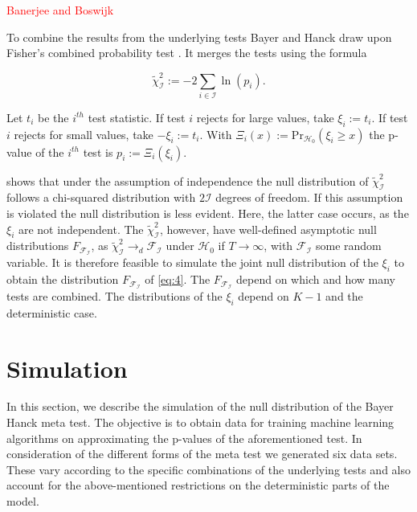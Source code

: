 \documentclass[12pt,a4paper]{article}
\begin{document}
\textcolor{red}{Banerjee and Boswijk}

To combine the results from the underlying tests Bayer and Hanck draw
upon Fisher's combined probability test \autocite{Fisher_1932}. It
merges the tests using the formula

\begin{equation}
\tilde{\chi}^2_{\mathcal{I}} := -2 \sum_{i \in \mathcal{I}} \ln{(p_i)}. 
\label{eq:4}
\end{equation}

Let \(t_i\) be the \(i^{th}\) test statistic. If test \(i\) rejects for
large values, take \(\xi_i := t_i\). If test \(i\) rejects for small
values, take \(-\xi_i := t_i\). With
\(\Xi_i(x) := \text{Pr}_{\mathcal{H_0}}(\xi_i \geq x)\) the p-value of
the \(i^{th}\) test is \(p_i := \Xi_i(\xi_i)\).

\textcite{Fisher_1932} shows that under the assumption of independence
the null distribution of \(\tilde{\chi}^2_{\mathcal{I}}\) follows a
chi-squared distribution with \(2\mathcal{I}\) degrees of freedom. If
this assumption is violated the null distribution is less evident. Here,
the latter case occurs, as the \(\xi_i\) are not independent. The
\(\tilde{\chi}^2_{\mathcal{I}}\), however, have well-defined asymptotic
null distributions \(F_{\mathcal{F_I}}\), as
\(\tilde{\chi}^2_{\mathcal{I}} \rightarrow_d \mathcal{F_I}\) under
\(\mathcal{H}_0\) if \(T \rightarrow \infty\), with \(\mathcal{F_I}\)
some random variable. It is therefore feasible to simulate the joint
null distribution of the \(\xi_i\) to obtain the distribution
\(F_{\mathcal{F_I}}\) of \eqref{eq:4}. The \(F_{\mathcal{F_I}}\) depend
on which and how many tests are combined. The distributions of the
\(\xi_i\) depend on \(K-1\) and the deterministic case.

\hypertarget{simulation}{%
\section{Simulation}\label{simulation}}

In this section, we describe the simulation of the null distribution of
the Bayer Hanck meta test. The objective is to obtain data for training
machine learning algorithms on approximating the p-values of the
aforementioned test. In consideration of the different forms of the meta
test we generated six data sets. These vary according to the specific
combinations of the underlying tests and also account for the
above-mentioned restrictions on the deterministic parts of the model.
\end{document}
